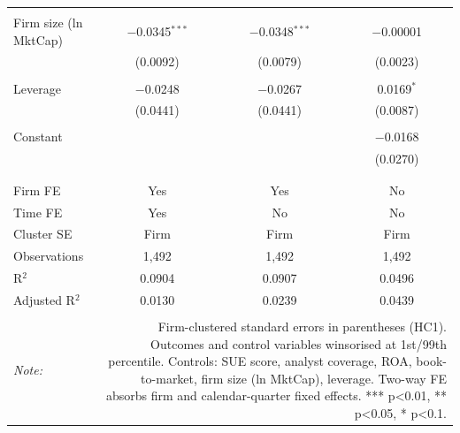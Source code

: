 \begin{table}[!htbp]
\begin{tabular}{@{\extracolsep{5pt}}lccc}
  & & & \\ 
 Firm size (ln MktCap) & $-$0.0345$^{***}$ & $-$0.0348$^{***}$ & $-$0.00001 \\ 
  & (0.0092) & (0.0079) & (0.0023) \\ 
  & & & \\ 
 Leverage & $-$0.0248 & $-$0.0267 & 0.0169$^{*}$ \\ 
  & (0.0441) & (0.0441) & (0.0087) \\ 
  & & & \\ 
 Constant &  &  & $-$0.0168 \\ 
  &  &  & (0.0270) \\ 
  & & & \\ 
\hline \\[-1.8ex] 
Firm FE & Yes & Yes & No \\ 
Time FE & Yes & No & No \\ 
Cluster SE & Firm & Firm & Firm \\ 
Observations & 1,492 & 1,492 & 1,492 \\ 
R$^{2}$ & 0.0904 & 0.0907 & 0.0496 \\ 
Adjusted R$^{2}$ & 0.0130 & 0.0239 & 0.0439 \\ 
\hline 
\hline \\[-1.8ex] 
\textit{Note:}  & \multicolumn{3}{r}{Firm-clustered standard errors in parentheses (HC1). Outcomes and control variables winsorised at 1st/99th percentile. Controls: SUE score, analyst coverage, ROA, book-to-market, firm size (ln MktCap), leverage. Two-way FE absorbs firm and calendar-quarter fixed effects. *** p<0.01, ** p<0.05, * p<0.1.} \\ 
\end{tabular} 
\end{table} 
